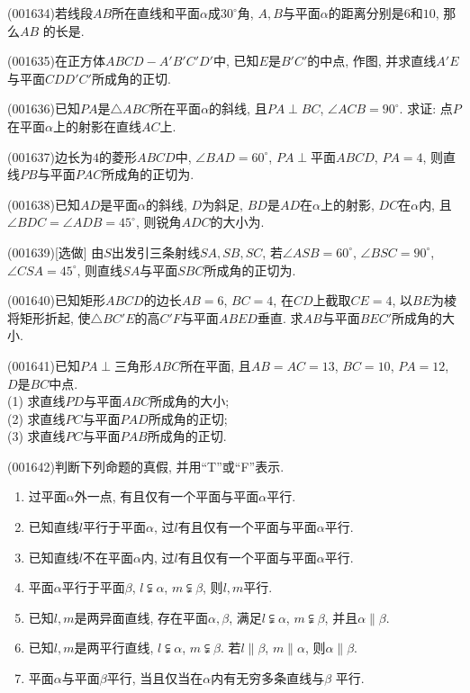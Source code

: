 \item (001634)若线段$AB$所在直线和平面$\alpha$成$30^\circ$角, $A,B$与平面$\alpha$的距离分别是$6$和$10$, 那么$AB$ 的长是.
\item (001635)在正方体$ABCD-A'B'C'D'$中, 已知$E$是$B'C'$的中点, 作图, 并求直线$A'E$与平面$CDD'C'$所成角的正切.
\item (001636)已知$PA$是$\triangle ABC$所在平面$\alpha$的斜线, 且$PA\perp BC$, $\angle ACB=90^\circ$. 求证: 点$P$在平面$\alpha$上的射影在直线$AC$上.
\item (001637)边长为$4$的菱形$ABCD$中, $\angle BAD=60^\circ$, $PA\perp$平面$ABCD$, $PA=4$, 则直线$PB$与平面$PAC$所成角的正切为.
\item (001638)已知$AD$是平面$\alpha$的斜线, $D$为斜足, $BD$是$AD$在$\alpha$上的射影, $DC$在$\alpha$内, 且$\angle BDC=\angle ADB=45^\circ$, 则锐角$ADC$的大小为.
\item (001639)[选做]
由$S$出发引三条射线$SA,SB,SC$, 若$\angle ASB=60^\circ$, $\angle BSC=90^\circ$, $\angle CSA=45^\circ$,
则直线$SA$与平面$SBC$所成角的正切为.
\item (001640)已知矩形$ABCD$的边长$AB=6$, $BC=4$, 在$CD$上截取$CE=4$, 以$BE$为棱将矩形折起, 使$\triangle BC'E$的高$C'F$与平面$ABED$垂直. 求$AB$与平面$BEC'$所成角的大小.
\item (001641)已知$PA\perp$三角形$ABC$所在平面, 且$AB=AC=13$, $BC=10$, $PA=12$, $D$是$BC$中点.\\ 
(1) 求直线$PD$与平面$ABC$所成角的大小;\\ 
(2) 求直线$PC$与平面$PAD$所成角的正切;\\ 
(3) 求直线$PC$与平面$PAB$所成角的正切.
\item (001642)判断下列命题的真假, 并用``{\rm T}''或``{\rm F}''表示.\\ 
\begin{enumerate}[\blank{30}(1)]
\item 过平面$\alpha$外一点, 有且仅有一个平面与平面$\alpha$平行.\\ 
\item 已知直线$l$平行于平面$\alpha$, 过$l$有且仅有一个平面与平面$\alpha$平行.\\ 
\item 已知直线$l$不在平面$\alpha$内, 过$l$有且仅有一个平面与平面$\alpha$平行.\\ 
\item 平面$\alpha$平行于平面$\beta$, $l\subsetneqq \alpha$, $m\subsetneqq \beta$, 则$l,m$平行.\\ 
\item 已知$l,m$是两异面直线, 存在平面$\alpha,\beta$, 满足$l\subsetneqq \alpha$, $m\subsetneqq\beta$, 并且$\alpha\parallel \beta$.\\ 
\item 已知$l,m$是两平行直线, $l\subsetneqq \alpha$, $m\subsetneqq \beta$. 若$l\parallel \beta$, $m\parallel \alpha$, 则$\alpha\parallel \beta$.\\ 
\item 平面$\alpha$与平面$\beta$平行, 当且仅当在$\alpha$内有无穷多条直线与$\beta$ 平行.\\ 
\end{enumerate}
